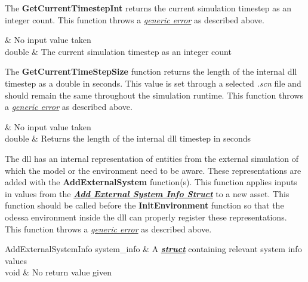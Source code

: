     \hspace{\parindent}\unclass The \textcolor{red5}{\textbf{GetCurrentTimestepInt}} returns the current simulation timestep as an integer count. This function throws a \hyperlink{genericerror}{\textit{generic error}} as described above.

    {
               & No input value taken\\
    }{
        double & The current simulation timestep as an integer count\\
    }
%
%

    \hspace{\parindent}\unclass The \textcolor{red5}{\textbf{GetCurrentTimeStepSize}} function returns the length of the internal \gls{dll} timestep as a double in seconds. This value is set through a selected \textit{.scn} file and should remain the same throughout the simulation runtime. This function throws a \hyperlink{genericerror}{\textit{generic error}} as described above.

    {
               & No input value taken\\
    }{
        double & Returns the length of the internal \gls{dll} timestep in seconds\\
    }
%
%

    \hspace{\parindent}\unclass The \gls{dll} has an internal representation of entities from the external simulation of which the model or the environment need to be aware. These representations are added with the \textcolor{red5}{\textbf{AddExternalSystem}} function(s). This function applies inputs in values from the \textbf{\textit{\hyperref[tab:addtargetstruct]{Add External System Info Struct}}} to a new asset. This function should be called before the \textcolor{red5}{\textbf{InitEnvironment}} function so that the \gls{odessa} environment inside the \gls{dll} can properly register these representations. This function throws a \hyperlink{genericerror}{\textit{generic error}} as described above.

    {
        AddExternalSystemInfo system\_info & A \textbf{\textit{\hyperref[tab:addtargetstruct]{struct}}} containing relevant system info values\\
    }{
        void                               & No return value given\\
    }

